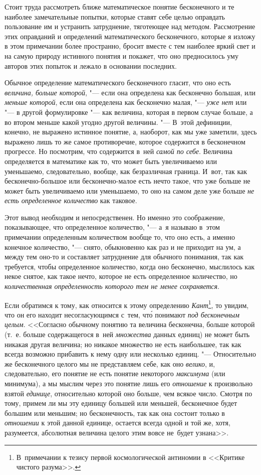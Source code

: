 Стоит труда рассмотреть ближе математическое понятие бесконечного и те наиболее
замечательные попытки, которые ставят себе целью оправдать пользование им
и устранить затруднение, тяготеющее над методом. Рассмотрение этих оправданий
и определений математического бесконечного, которые я изложу в этом примечании
более пространно, бросит вместе с тем наиболее яркий свет и на самую природу
истинного понятия и покажет, что оно предносилось уму авторов этих попыток
и лежало в основании последних.

Обычное определение математического бесконечного гласит, что оно есть
{\em величина, больше которой}, "--- если она определена как бесконечно
большая, или {\em меньше которой}, если она определена как бесконечно малая,
"--- {\em уже нет} или "--- в другой формулировке "--- как величина, которая
в первом случае больше, а во втором меньше какой угодно другой величины. "---
В~этой дефиниции, конечно, не выражено истинное понятие, а, наоборот, как мы
уже заметили, здесь выражено лишь то же самое противоречие, которое содержится
в бесконечном прогрессе. Но посмотрим, что содержится в~ней
{\em самой по себе}. Величина определяется в математике как то, что может быть
увеличиваемо или уменьшаемо, следовательно, вообще, как безразличная граница.
И~вот, так как бесконечно-большое или бесконечно-малое есть нечто такое, что
уже больше не может быть увеличиваемо или уменьшаемо, то оно на самом деле уже
больше {\em не есть определенное количество} как таковое.

Этот вывод необходим и непосредственен. Но именно это соображение,
показывающее, что определенное количество, "--- а~я называю в~этом примечании
определенным количеством вообще то, что оно есть, а именно конечное количество,
"--- снято, обыкновенно как раз и не приходит на ум, а между тем оно-то
и составляет затруднение для обычного понимания, так как требуется, чтобы
определенное количество, когда оно бесконечно, мыслилось как некое снятое,
как такое нечто, которое не есть определенное количество, но
{\em количественная определенность которого тем не менее сохраняется}.

Если обратимся к тому, как относится к этому определению
{\em Кант}\footnote{В~примечании к тезису первой космологической антиномии
в <<Критике чистого разума>>.}, то увидим, что он его находит несогласующимся
с~тем, чт\'{о} понимают {\em под бесконечным целым}. <<Согласно обычному
понятию та величина бесконечна, больше которой (т.~е. больше содержащегося
в~ней {\em множества} данных единиц) не может быть никакая другая величина; но
никакое множество не есть наибольшее, так как всегда возможно прибавить к нему
одну или несколько единиц. "--- Относительно же бесконечного целого мы не
представляем себе, как оно {\em велико}, и, следовательно, его понятие не есть
понятие некоторого {\em максимума} (или минимума), а мы мыслим через это
понятие лишь его {\em отношение} к произвольно взятой {\em единице},
относительно которой оно больше, чем всякое число. Смотря по тому, примем ли
мы эту единицу большей или меньшей, бесконечное будет большим или меньшим; но
бесконечность, так как она состоит только в {\em отношении} к этой данной
единице, остается всегда одной и той же, хотя, разумеется, абсолютная величина
целого этим вовсе не~будет узнана>>.

